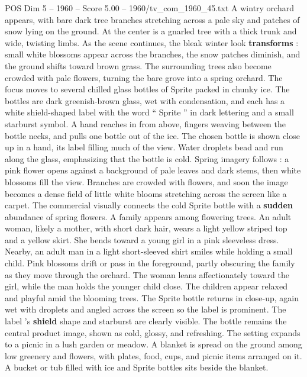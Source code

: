 \begin{textsample}{POS Dim 5 – 1960 – Score 5.00 – 1960/tv\_com\_1960\_45.txt}  \label{ex:f5_pos_060}
A wintry orchard appears, with bare dark tree branches stretching across a pale sky and patches of snow lying on the ground.
At the center is a gnarled tree with a thick trunk and wide, twisting limbs.
As the scene continues, the bleak winter look \textbf{transforms} : small white blossoms appear across the branches, the snow patches diminish, and the ground shifts toward brown grass.
The surrounding trees also become crowded with pale flowers, turning the bare grove into a spring orchard.
The focus moves to several chilled glass bottles of Sprite packed in chunky ice.
The bottles are dark greenish-brown glass, wet with condensation, and each has a white shield-shaped label with the word “ Sprite ” in dark lettering and a small starburst symbol.
A hand reaches in from above, fingers weaving between the bottle necks, and pulls one bottle out of the ice.
The chosen bottle is shown close up in a hand, its label filling much of the view.
Water droplets bead and run along the glass, emphasizing that the bottle is cold.
Spring imagery follows : a pink flower opens against a background of pale leaves and dark stems, then white blossoms fill the view.
Branches are crowded with flowers, and soon the image becomes a dense field of little white blooms stretching across the screen like a carpet.
The commercial visually connects the cold Sprite bottle with a \textbf{sudden} abundance of spring flowers.
A family appears among flowering trees.
An adult woman, likely a mother, with short dark hair, wears a light yellow striped top and a yellow skirt.
She bends toward a young girl in a pink sleeveless dress.
Nearby, an adult man in a light short-sleeved shirt smiles while holding a small child.
Pink blossoms drift or pass in the foreground, partly obscuring the family as they move through the orchard.
The woman leans affectionately toward the girl, while the man holds the younger child close.
The children appear relaxed and playful amid the blooming trees.
The Sprite bottle returns in close-up, again wet with droplets and angled across the screen so the label is prominent.
The label ’s \textbf{shield} shape and starburst are clearly visible.
The bottle remains the central product image, shown as cold, glossy, and refreshing.
The setting expands to a picnic in a lush garden or meadow.
A blanket is spread on the ground among low greenery and flowers, with plates, food, cups, and picnic items arranged on it.
A bucket or tub filled with ice and Sprite bottles sits beside the blanket.

\end{textsample}
